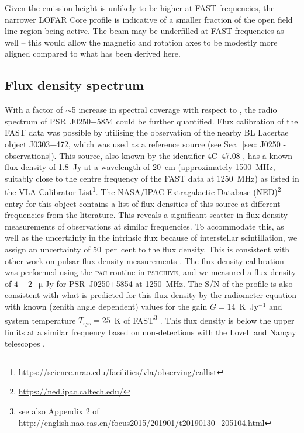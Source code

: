 Given the emission height is unlikely to be higher at FAST frequencies, the narrower LOFAR Core profile is indicative of a smaller fraction of the open field line region being active. The beam may be underfilled at FAST frequencies as well -- this would allow the magnetic and rotation axes to be modestly more aligned compared to what has been derived here. 
























\subsection{Flux density spectrum}
\label{sec: J0250 - analysis - flux}

With a factor of $\sim$5 increase in spectral coverage with respect to \citet{TBC+2018}, the radio spectrum of PSR~J0250+5854 could be further quantified. Flux calibration of the FAST data was possible by utilising the observation of the nearby BL Lacertae object J0303+472, which was used as a reference source (see Sec.~\ref{sec: J0250 - observations}). This source, also known by the identifier 4C~47.08 \citep{VVxx2006}, has a known flux density of 1.8~Jy at a wavelength of 20~cm (approximately 1500~MHz, suitably close to the centre frequency of the FAST data at 1250~MHz) as listed in the VLA Calibrator List\footnote{\url{https://science.nrao.edu/facilities/vla/observing/callist}}. The NASA/IPAC Extragalactic Database (NED)\footnote{\url{https://ned.ipac.caltech.edu/}} entry for this object contains a list of flux densities of this source at different frequencies from the literature. This reveals a significant scatter in flux density measurements of observations at similar frequencies. To accommodate this, as well as the uncertainty in the intrinsic flux because of interstellar scintillation, we assign an uncertainty of 50~per~cent to the flux density. This is consistent with other work on pulsar flux density measurements \citep[e.g.][]{Sxxx1973}. The flux density calibration was performed using the \textsc{pac} routine in \textsc{psrchive}, and we measured a flux density of $4\pm2$~$\upmu$Jy for PSR~J0250+5854 at 1250~MHz. The S/N of the profile is also consistent with what is predicted for this flux density by the radiometer equation \citep[e.g.][]{Handbook} with known (zenith angle dependent) values for the gain $G = 14$~K~Jy$^{-1}$ and system temperature $T_\mathrm{sys} = 25$~K of FAST\footnote{see also Appendix 2 of \url{http://english.nao.cas.cn/focus2015/201901/t20190130_205104.html}} \citep{LWQ+2018}. This flux density is below the upper limits at a similar frequency based on non-detections with the Lovell and Nan\c{c}ay telescopes \citep{TBC+2018}.

